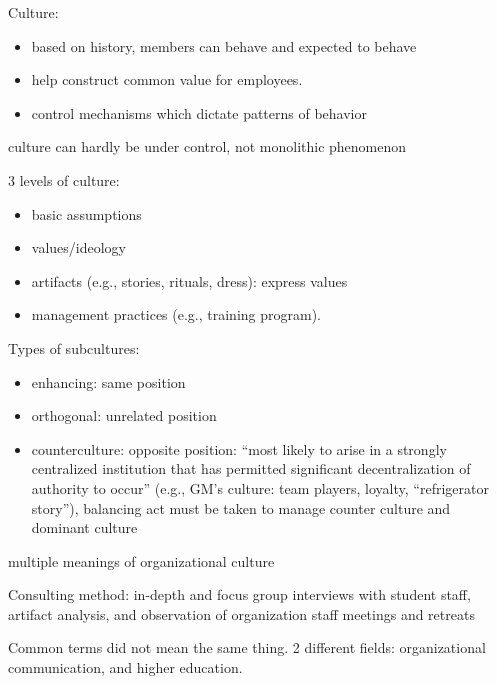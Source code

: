 \documentclass[
]{book}
\providecommand{\tightlist}{%
  \setlength{\itemsep}{0pt}\setlength{\parskip}{0pt}}
\begin{document}
\citep{Martin_1983}

Culture:

\begin{itemize}
\tightlist
\item
  based on history, members can behave and expected to behave\\
\item
  help construct common value for employees.\\
\item
  control mechanisms which dictate patterns of behavior
\end{itemize}

culture can hardly be under control, not monolithic phenomenon

3 levels of culture:

\begin{itemize}
\tightlist
\item
  basic assumptions\\
\item
  values/ideology\\
\item
  artifacts (e.g., stories, rituals, dress): express values\\
\item
  management practices (e.g., training program).
\end{itemize}

Types of subcultures:

\begin{itemize}
\tightlist
\item
  enhancing: same position\\
\item
  orthogonal: unrelated position\\
\item
  counterculture: opposite position: ``most likely to arise in a strongly centralized institution that has permitted significant decentralization of authority to occur'' (e.g., GM's culture: team players, loyalty, ``refrigerator story''), balancing act must be taken to manage counter culture and dominant culture
\end{itemize}

\citep{Dixon_2009}
multiple meanings of organizational culture

Consulting method: in-depth and focus group interviews with student staff, artifact analysis, and observation of organization staff meetings and retreats

Common terms did not mean the same thing. 2 different fields: organizational communication, and higher education.
\end{document}
